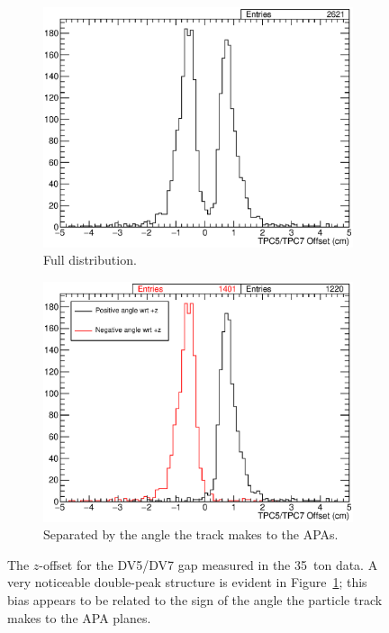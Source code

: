 \begin{figure}
  \centering
  \begin{subfigure}[t]{\linewidth}
    \centering
    \includegraphics[width=12cm]{TPC5TPC7Gap.eps}
    \caption{Full distribution.}
    \label{fig:DV5DV7Gap}
  \end{subfigure}
  \hfill
  \begin{subfigure}[t]{\linewidth}
    \centering
    \includegraphics[width=12cm]{TPC5TPC7GapAngle.eps}
    \caption{Separated by the angle the track makes to the APAs.}
    \label{fig:DV5DV7GapAngle}
  \end{subfigure}
  \caption[The $z$-offset for the DV5/DV7 gap measured in the 35~ton data.]{The $z$-offset for the DV5/DV7 gap measured in the 35~ton data.  A very noticeable double-peak structure is evident in Figure~\ref{fig:DV5DV7Gap}; this bias appears to be related to the sign of the angle the particle track makes to the APA planes.}
  \label{fig:DV5DV7XOffsetZOffset}
\end{figure}

